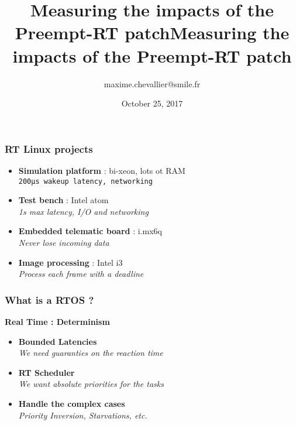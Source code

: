 \documentclass{smilebeamer}
\title{Measuring the impacts of the Preempt-RT patch}
\author{maxime.chevallier@smile.fr}
\begin{document}
\begin{frame}[plain]
	\title{Measuring the impacts of the Preempt-RT patch}
	\date{October 25, 2017}
    \titlepage
\end{frame}

\begin{frame}
	\frametitle{RT Linux projects}
		\begin{itemize}
			\item<1-> \textbf{Simulation platform} : bi-xeon, lots ot RAM \\ \small{\texttt{200µs wakeup latency, networking}}
			\vspace{0.3cm}
			\item<2-> \textbf{Test bench} : Intel atom \\ \small{\textit{1s max latency, I/O and networking}}
			\vspace{0.3cm}
			\item<3-> \textbf{Embedded telematic board} : i.mx6q \\ \small{\textit{Never lose incoming data}}
			\vspace{0.3cm}
			\item<4-> \textbf{Image processing} : Intel i3 \\ \small{\textit{Process each frame with a deadline}}
		\end{itemize}
\end{frame}

\begin{frame}
	\frametitle{What is a RTOS ?}

	\textbf{Real Time : Determinism}

	\begin{itemize}
		\item \textbf{Bounded Latencies} \\ \small{\textit{We need guaranties on the reaction time}}
			\vspace{0.3cm}
		\item \textbf{RT Scheduler} \\ \small{\textit{We want absolute priorities for the tasks}}
			\vspace{0.3cm}
		\item \textbf{Handle the complex cases} \\ \small{\textit{Priority Inversion, Starvations, etc.}}
	\end{itemize}

\end{frame}
\end{document}
